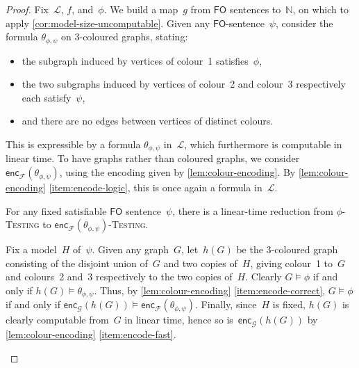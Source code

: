 \documentclass[10pt,a4paper]{amsart}
\newcommand{\Lc}{\mathcal{L}}
\newcommand{\Nn}{\mathbb{N}}
\newcommand{\encF}{\mathsf{enc}_{\mathcal{F}}}
\newcommand{\encG}{\mathsf{enc}_{\mathcal{G}}}
\newcommand{\fo}{\ensuremath{\mathsf{FO}}\xspace}
\newcommand{\testing}[1]{#1-\textsc{Testing}\xspace}
\begin{document}
\begin{proof}
    Fix~$\Lc$, $f$, and~$\phi$. We build a map~$g$ from \fo sentences to~$\Nn$, on which to apply \cref{cor:model-size-uncomputable}.
    Given any \fo-sentence~$\psi$, consider the formula $\theta_{\phi,\psi}$ on 3-coloured graphs, stating:
    \begin{itemize}
        \item the subgraph induced by vertices of colour~1 satisfies~$\phi$,
        \item the two subgraphs induced by vertices of colour~2 and colour~3 respectively each satisfy~$\psi$,
        \item and there are no edges between vertices of distinct colours.
    \end{itemize}
    
    This is expressible by a formula $\theta_{\phi,\psi}$ in~$\Lc$, which furthermore is computable in linear time.
    To have graphs rather than coloured graphs, we consider $\encF(\theta_{\phi,\psi})$, using the encoding given by \cref{lem:colour-encoding}.
    By \cref{lem:colour-encoding} \eqref{item:encode-logic}, this is once again a formula in~$\Lc$.

    \begin{claim}\label{clm:encode-reduction}
        For any fixed satisfiable \fo sentence~$\psi$,
        there is a linear-time reduction from \testing{$\phi$} to \testing{$\encF(\theta_{\phi,\psi})$}.
    \end{claim}
    \begin{claimproof}
        Fix a model~$H$ of~$\psi$.
        Given any graph~$G$, let~$h(G)$ be the 3-coloured graph consisting of the disjoint union of~$G$ and two copies of~$H$,
        giving colour~1 to~$G$ and colours~2 and~3 respectively to the two copies of~$H$.
        Clearly $G \models \phi$ if and only if $h(G) \models \theta_{\phi,\psi}$.
        Thus, by \cref{lem:colour-encoding} \eqref{item:encode-correct}, $G \models \phi$ if and only if $\encG(h(G)) \models \encF(\theta_{\phi,\psi})$.
        Finally, since~$H$ is fixed, $h(G)$ is clearly computable from~$G$ in linear time, hence so is~$\encG(h(G))$ by \cref{lem:colour-encoding} \eqref{item:encode-fast}.
    \end{claimproof}


\end{proof}
\end{document}
